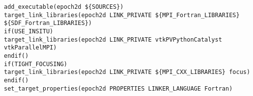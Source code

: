 \begin{lstlisting}[style=FORTRAN, caption=EPOCH CMakeLists file to generate platform-specific build scripts]
add_executable(epoch2d ${SOURCES})
target_link_libraries(epoch2d LINK_PRIVATE ${MPI_Fortran_LIBRARIES} ${SDF_Fortran_LIBRARIES})
if(USE_INSITU)
target_link_libraries(epoch2d LINK_PRIVATE vtkPVPythonCatalyst vtkParallelMPI)
endif()
if(TIGHT_FOCUSING)
target_link_libraries(epoch2d LINK_PRIVATE ${MPI_CXX_LIBRARIES} focus)
endif()
set_target_properties(epoch2d PROPERTIES LINKER_LANGUAGE Fortran)
\end{lstlisting}